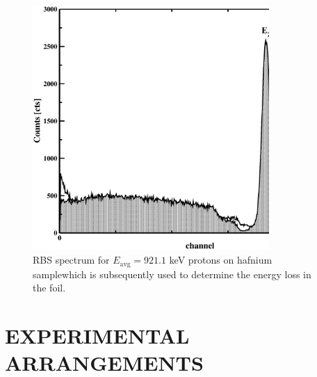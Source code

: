\documentclass[aps,pra,reprint,superscriptaddress]{revtex4-1} %
\providecommand{\DIFadd}[1]{{\protect\color{blue}\uwave{#1}}} %
\providecommand{\DIFaddbegin}{} %
\providecommand{\DIFdelbegin}{} %
\providecommand{\DIFdelend}{} %
\providecommand{\DIFaddFL}[1]{\DIFadd{#1}} %
\providecommand{\DIFaddbeginFL}{} %
\providecommand{\DIFaddendFL}{} %
\newcommand{\DIFscaledelfig}{0.5}
\newlength{\DIFdelgraphicswidth} %
\newlength{\DIFdelgraphicsheight} %
\newcommand{\DIFaddincludegraphics}[2][]{{\color{blue}\fbox{\DIFOincludegraphics[#1]{#2}}}} %
\newcommand{\DIFdelincludegraphics}[2][]{%
\sbox{\DIFdelgraphicsbox}{\DIFOincludegraphics[#1]{#2}}%
\settoboxwidth{\DIFdelgraphicswidth}{\DIFdelgraphicsbox} %
\settoboxtotalheight{\DIFdelgraphicsheight}{\DIFdelgraphicsbox} %
\scalebox{\DIFscaledelfig}{%
\parbox[b]{\DIFdelgraphicswidth}{\usebox{\DIFdelgraphicsbox}\\[-\baselineskip] \rule{\DIFdelgraphicswidth}{0em}}\llap{\resizebox{\DIFdelgraphicswidth}{\DIFdelgraphicsheight}{%
\setlength{\unitlength}{\DIFdelgraphicswidth}%
\begin{picture}(1,1)%
\thicklines\linethickness{2pt} %
{\color[rgb]{1,0,0}\put(0,0){\framebox(1,1){}}}%
{\color[rgb]{1,0,0}\put(0,0){\line( 1,1){1}}}%
{\color[rgb]{1,0,0}\put(0,1){\line(1,-1){1}}}%
\end{picture}%
}\hspace*{3pt}}} %
} %
\DeclareRobustCommand{\DIFaddbegin}{\DIFOaddbegin \let\includegraphics\DIFaddincludegraphics} %
\DeclareRobustCommand{\DIFdelbegin}{\DIFOdelbegin \let\includegraphics\DIFdelincludegraphics} %
\DeclareRobustCommand{\DIFdelend}{\DIFOaddend \let\includegraphics\DIFOincludegraphics} %
\DeclareRobustCommand{\DIFaddbeginFL}{\DIFOaddbeginFL \let\includegraphics\DIFaddincludegraphics} %
\DeclareRobustCommand{\DIFaddendFL}{\DIFOaddendFL \let\includegraphics\DIFOincludegraphics} %
\begin{document}
\DIFdelbegin %

\DIFdelend %
\begin{figure}[!t]
\centering
\includegraphics[width=9cm]{Fig01.eps}
\caption{RBS spectrum for $E_{\mathrm{avg}}=921.1$ keV protons on 
\DIFaddbeginFL \DIFaddFL{the }\DIFaddendFL hafnium sample\DIFaddbeginFL \DIFaddFL{, }\DIFaddendFL which is subsequently used to determine the energy 
loss in the foil.}
\label{F01}
\end{figure}


\DIFdelbegin %

\DIFdelend %
\section{EXPERIMENTAL ARRANGEMENTS}
\label{experiment}
\DIFaddbegin 
\end{document}
